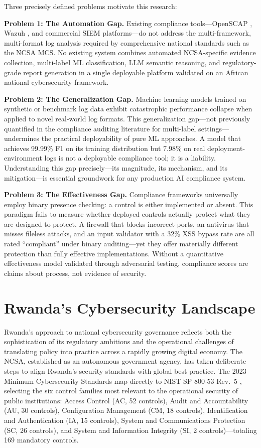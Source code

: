 \documentclass[12pt,oneside]{report}
\begin{document}
Three precisely defined problems motivate this research:

\textbf{Problem 1: The Automation Gap.} Existing compliance tools—OpenSCAP \cite{openscap}, Wazuh \cite{wazuh_ref}, and commercial SIEM platforms—do not address the multi-framework, multi-format log analysis required by comprehensive national standards such as the NCSA MCS. No existing system combines automated NCSA-specific evidence collection, multi-label ML classification, LLM semantic reasoning, and regulatory-grade report generation in a single deployable platform validated on an African national cybersecurity framework.

\textbf{Problem 2: The Generalization Gap.} Machine learning models trained on synthetic or benchmark log data exhibit catastrophic performance collapse when applied to novel real-world log formats. This generalization gap—not previously quantified in the compliance auditing literature for multi-label settings—undermines the practical deployability of pure ML approaches. A model that achieves 99.99\% F1 on its training distribution but 7.98\% on real deployment-environment logs is not a deployable compliance tool; it is a liability. Understanding this gap precisely—its magnitude, its mechanism, and its mitigation—is essential groundwork for any production AI compliance system.

\textbf{Problem 3: The Effectiveness Gap.} Compliance frameworks universally employ binary presence checking: a control is either implemented or absent. This paradigm fails to measure whether deployed controls actually protect what they are designed to protect. A firewall that blocks incorrect ports, an antivirus that misses fileless attacks, and an input validator with a 32\% XSS bypass rate are all rated ``compliant'' under binary auditing—yet they offer materially different protection than fully effective implementations. Without a quantitative effectiveness model validated through adversarial testing, compliance scores are claims about process, not evidence of security.

\section{Rwanda's Cybersecurity Landscape}

Rwanda's approach to national cybersecurity governance reflects both the sophistication of its regulatory ambitions and the operational challenges of translating policy into practice across a rapidly growing digital economy. The NCSA, established as an autonomous government agency, has taken deliberate steps to align Rwanda's security standards with global best practice. The 2023 Minimum Cybersecurity Standards \cite{ncsa2023} map directly to NIST SP 800-53 Rev.\ 5 \cite{nist2020}, selecting the six control families most relevant to the operational security of public institutions: Access Control (AC, 52 controls), Audit and Accountability (AU, 30 controls), Configuration Management (CM, 18 controls), Identification and Authentication (IA, 15 controls), System and Communications Protection (SC, 26 controls), and System and Information Integrity (SI, 2 controls)—totaling 169 mandatory controls.
\end{document}
